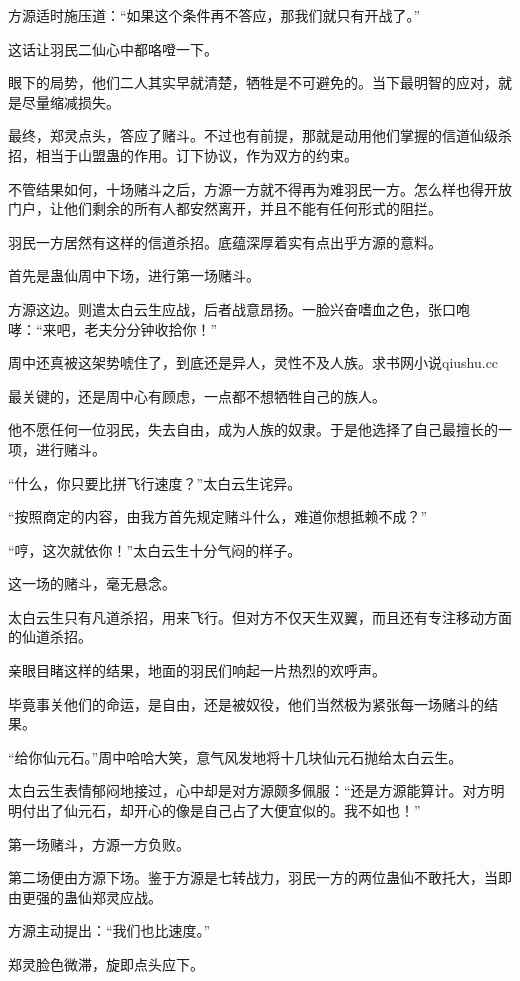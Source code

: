 \begin{this_body}
方源适时施压道：“如果这个条件再不答应，那我们就只有开战了。”

这话让羽民二仙心中都咯噔一下。

眼下的局势，他们二人其实早就清楚，牺牲是不可避免的。当下最明智的应对，就是尽量缩减损失。

最终，郑灵点头，答应了赌斗。不过也有前提，那就是动用他们掌握的信道仙级杀招，相当于山盟蛊的作用。订下协议，作为双方的约束。

不管结果如何，十场赌斗之后，方源一方就不得再为难羽民一方。怎么样也得开放门户，让他们剩余的所有人都安然离开，并且不能有任何形式的阻拦。

羽民一方居然有这样的信道杀招。底蕴深厚着实有点出乎方源的意料。

首先是蛊仙周中下场，进行第一场赌斗。

方源这边。则遣太白云生应战，后者战意昂扬。一脸兴奋嗜血之色，张口咆哮：“来吧，老夫分分钟收拾你！”

周中还真被这架势唬住了，到底还是异人，灵性不及人族。求书网小说qiushu.cc

最关键的，还是周中心有顾虑，一点都不想牺牲自己的族人。

他不愿任何一位羽民，失去自由，成为人族的奴隶。于是他选择了自己最擅长的一项，进行赌斗。

“什么，你只要比拼飞行速度？”太白云生诧异。

“按照商定的内容，由我方首先规定赌斗什么，难道你想抵赖不成？”

“哼，这次就依你！”太白云生十分气闷的样子。

这一场的赌斗，毫无悬念。

太白云生只有凡道杀招，用来飞行。但对方不仅天生双翼，而且还有专注移动方面的仙道杀招。

亲眼目睹这样的结果，地面的羽民们响起一片热烈的欢呼声。

毕竟事关他们的命运，是自由，还是被奴役，他们当然极为紧张每一场赌斗的结果。

“给你仙元石。”周中哈哈大笑，意气风发地将十几块仙元石抛给太白云生。

太白云生表情郁闷地接过，心中却是对方源颇多佩服：“还是方源能算计。对方明明付出了仙元石，却开心的像是自己占了大便宜似的。我不如也！”

第一场赌斗，方源一方负败。

第二场便由方源下场。鉴于方源是七转战力，羽民一方的两位蛊仙不敢托大，当即由更强的蛊仙郑灵应战。

方源主动提出：“我们也比速度。”

郑灵脸色微滞，旋即点头应下。


\end{this_body}
